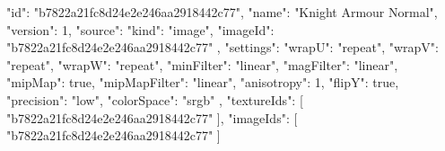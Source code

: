 {
  "id": "b7822a21fc8d24e2e246aa2918442c77",
  "name": "Knight Armour Normal",
  "version": 1,
  "source": {
    "kind": "image",
    "imageId": "b7822a21fc8d24e2e246aa2918442c77"
  },
  "settings": {
    "wrapU": "repeat",
    "wrapV": "repeat",
    "wrapW": "repeat",
    "minFilter": "linear",
    "magFilter": "linear",
    "mipMap": true,
    "mipMapFilter": "linear",
    "anisotropy": 1,
    "flipY": true,
    "precision": "low",
    "colorSpace": "srgb"
  },
  "textureIds": [
    "b7822a21fc8d24e2e246aa2918442c77"
  ],
  "imageIds": [
    "b7822a21fc8d24e2e246aa2918442c77"
  ]
}
